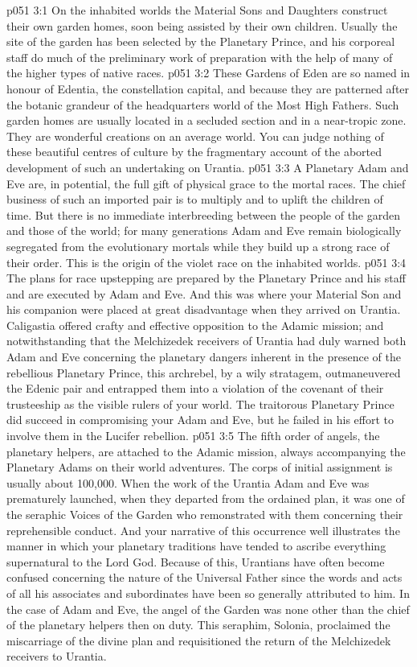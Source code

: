 \vs p051 3:1 On the inhabited worlds the Material Sons and Daughters construct their own garden homes, soon being assisted by their own children. Usually the site of the garden has been selected by the Planetary Prince, and his corporeal staff do much of the preliminary work of preparation with the help of many of the higher types of native races.
\vs p051 3:2 These Gardens of Eden are so named in honour of Edentia, the constellation capital, and because they are patterned after the botanic grandeur of the headquarters world of the Most High Fathers. Such garden homes are usually located in a secluded section and in a near\hyp{}tropic zone. They are wonderful creations on an average world. You can judge nothing of these beautiful centres of culture by the fragmentary account of the aborted development of such an undertaking on Urantia.
\vs p051 3:3 \pc A Planetary Adam and Eve are, in potential, the full gift of physical grace to the mortal races. The chief business of such an imported pair is to multiply and to uplift the children of time. But there is no immediate interbreeding between the people of the garden and those of the world; for many generations Adam and Eve remain biologically segregated from the evolutionary mortals while they build up a strong race of their order. This is the origin of the violet race on the inhabited worlds.
\vs p051 3:4 The plans for race upstepping are prepared by the Planetary Prince and his staff and are executed by Adam and Eve. And this was where your Material Son and his companion were placed at great disadvantage when they arrived on Urantia. Caligastia offered crafty and effective opposition to the Adamic mission; and notwithstanding that the Melchizedek receivers of Urantia had duly warned both Adam and Eve concerning the planetary dangers inherent in the presence of the rebellious Planetary Prince, this archrebel, by a wily stratagem, outmaneuvered the Edenic pair and entrapped them into a violation of the covenant of their trusteeship as the visible rulers of your world. The traitorous Planetary Prince did succeed in compromising your Adam and Eve, but he failed in his effort to involve them in the Lucifer rebellion.
\vs p051 3:5 \pc The fifth order of angels, the planetary helpers, are attached to the Adamic mission, always accompanying the Planetary Adams on their world adventures. The corps of initial assignment is usually about 100,000. When the work of the Urantia Adam and Eve was prematurely launched, when they departed from the ordained plan, it was one of the seraphic Voices of the Garden who remonstrated with them concerning their reprehensible conduct. And your narrative of this occurrence well illustrates the manner in which your planetary traditions have tended to ascribe everything supernatural to the Lord God. Because of this, Urantians have often become confused concerning the nature of the Universal Father since the words and acts of all his associates and subordinates have been so generally attributed to him. In the case of Adam and Eve, the angel of the Garden was none other than the chief of the planetary helpers then on duty. This seraphim, Solonia, proclaimed the miscarriage of the divine plan and requisitioned the return of the Melchizedek receivers to Urantia.
